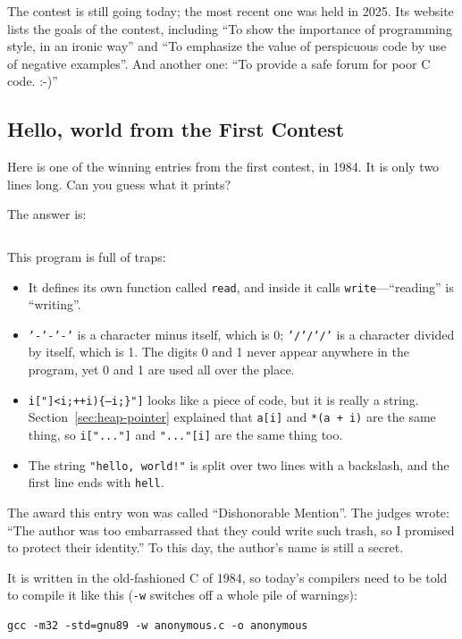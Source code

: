 The contest is still going today; the most recent one was held in 2025. Its website lists the goals of the contest, including ``To show the importance of programming style, in an ironic way'' and ``To emphasize the value of perspicuous code by use of negative examples''. And another one: ``To provide a safe forum for poor C code. :-)''

\subsection{Hello, world from the First Contest}

Here is one of the winning entries from the first contest, in 1984. It is only two lines long. Can you guess what it prints?


The answer is:
\inputminted[linenos=false]{text}{code/en/appc/out/anonymous.txt}

This program is full of traps:
\begin{itemize}
  \item It defines its own function called \texttt{read}, and inside it calls \texttt{write}---``reading'' is ``writing''.
  \item \texttt{'-'-'-'} is a character minus itself, which is 0; \texttt{'/'/'/'} is a character divided by itself, which is 1. The digits 0 and 1 never appear anywhere in the program, yet 0 and 1 are used all over the place.
  \item \texttt{i["]<i;++i)\{--i;\}"]} looks like a piece of code, but it is really a string. Section~\ref{sec:heap-pointer} explained that \texttt{a[i]} and \texttt{*(a + i)} are the same thing, so \texttt{i["..."]} and \texttt{"..."[i]} are the same thing too.
  \item The string \texttt{"hello, world!"} is split over two lines with a backslash, and the first line ends with \texttt{hell}.
\end{itemize}

The award this entry won was called ``Dishonorable Mention''. The judges wrote: ``The author was too embarrassed that they could write such trash, so I promised to protect their identity.'' To this day, the author's name is still a secret.

It is written in the old-fashioned C of 1984, so today's compilers need to be told to compile it like this (\texttt{-w} switches off a whole pile of warnings):
\begin{verbatim}
gcc -m32 -std=gnu89 -w anonymous.c -o anonymous
\end{verbatim}

